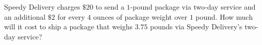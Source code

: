 Speedy Delivery charges $\$20$ to send a $1$-pound package via two-day service and an additional $\$2$ for every $4$ ounces of package weight over $1$ pound. How much will it cost to ship a package that weighs $3.75$ pounds via Speedy Delivery's two-day service?
